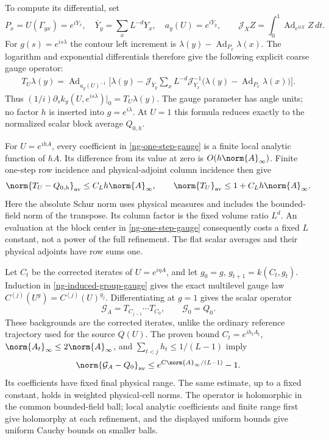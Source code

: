 To compute its differential, set
\[
 P_x=U(\Gamma_{yx})=e^{iY_x},\quad
 \overline Y_y=\sum_xL^{-d}Y_x,\quad
 a_y(U)=e^{i\overline Y_y},\qquad
 \mathcal J_X Z=\int_0^1\operatorname{Ad}_{e^{itX}}Z\,dt.
\]
For $g(s)=e^{is\lambda}$ the contour left increment is
$\lambda(y)-\operatorname{Ad}_{P_x}\lambda(x)$.
The logarithm and exponential differentials therefore give the
following explicit coarse gauge operator:
\begin{equation}\label{ng-one-step-gauge}
 \begin{split}
 T_U\lambda(y)=\operatorname{Ad}_{a_y(U)^{-1}}
 \bigg[\lambda(y)-\mathcal J_{\overline Y_y}
   \sum_xL^{-d}\mathcal J_{Y_x}^{-1}
       \bigl(\lambda(y)-\operatorname{Ad}_{P_x}\lambda(x)\bigr)
 \bigg].
 \end{split}
\end{equation}
Thus $(1/i)\partial_s k_y(U,e^{is\lambda})|_0=T_U\lambda(y)$.
The gauge parameter has angle units; no factor $h$ is inserted
into $g=e^{i\lambda}$. At $U=1$ this formula reduces exactly to
the normalized scalar block average $Q_{0,h}$.

For $U=e^{ihA}$, every coefficient in
\eqref{ng-one-step-gauge} is a finite local analytic function of
$hA$. Its difference from its value at zero is $O(h\norm{A}_\infty)$.
Finite one-step row incidence and physical-adjoint column incidence
then give
\begin{equation}\label{ng-one-step-smallness}
 \norm{T_U-Q_{0,h}}_{\rm av}\le C_Lh\norm{A}_\infty,
 \qquad \norm{T_U}_{\rm av}\le1+C_Lh\norm{A}_\infty.
\end{equation}
Here the absolute Schur norm uses physical measures and includes
the bounded-field norm of the transpose. Its column factor is the
fixed volume ratio $L^d$. An evaluation at the block center in
\eqref{ng-one-step-gauge} consequently costs a fixed $L$ constant,
not a power of the full refinement. The flat scalar averages and
their physical adjoints have row sums one.

Let $C_t$ be the corrected iterates of $U=e^{i\eta A}$, and let
$g_0=g$, $g_{t+1}=k(C_t,g_t)$. Induction in
\eqref{ng-induced-group-gauge} gives the exact multilevel gauge
law $C^{(j)}(U^g)=C^{(j)}(U)^{g_j}$. Differentiating at $g=1$
gives the scalar operator
\begin{equation}\label{ng-composite-gauge}
 \mathcal G_A=T_{C_{j-1}}\cdots T_{C_0},\qquad
 \mathcal G_0=Q_0.
\end{equation}
These backgrounds are the corrected iterates, unlike the ordinary
reference trajectory used for the source $Q(U)$. The proven bound
$C_t=e^{ih_tA_t}$, $\norm{A_t}_\infty\le2\norm{A}_\infty$,
and $\sum_{t<j}h_t\le1/(L-1)$ imply
\begin{equation}\label{ng-composite-smallness}
 \norm{\mathcal G_A-Q_0}_{\rm av}
       \le e^{C\norm{A}_\infty/(L-1)}-1.
\end{equation}
Its coefficients have fixed final physical range. The same estimate,
up to a fixed constant, holds in weighted physical-cell norms.
The operator is holomorphic in the common bounded-field ball;
local analytic coefficients and finite range first give holomorphy
at each refinement, and the displayed uniform bounds give uniform
Cauchy bounds on smaller balls.

